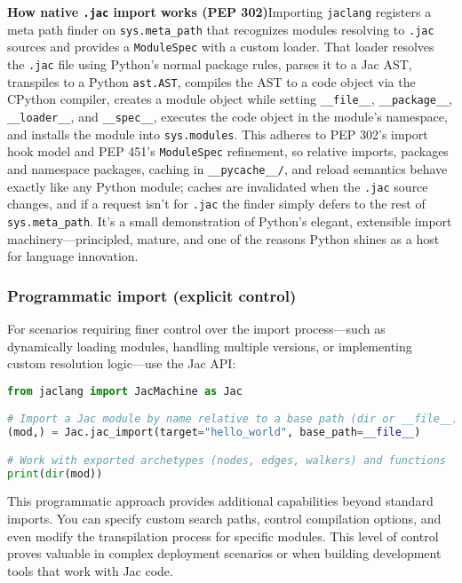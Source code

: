\begin{nerd}
\textbf{How native \texttt{.jac} import works (PEP 302)}\quad Importing \texttt{jaclang} registers a meta path finder on \texttt{sys.meta\_path} that recognizes modules resolving to \texttt{.jac} sources and provides a \texttt{ModuleSpec} with a custom loader. That loader resolves the \texttt{.jac} file using Python's normal package rules, parses it to a Jac AST, transpiles to a Python \texttt{ast.AST}, compiles the AST to a code object via the CPython compiler, creates a module object while setting \texttt{\_\_file\_\_}, \texttt{\_\_package\_\_}, \texttt{\_\_loader\_\_}, and \texttt{\_\_spec\_\_}, executes the code object in the module's namespace, and installs the module into \texttt{sys.modules}. This adheres to PEP 302's import hook model and PEP 451's \texttt{ModuleSpec} refinement, so relative imports, packages and namespace packages, caching in \texttt{\_\_pycache\_\_/}, and reload semantics behave exactly like any Python module; caches are invalidated when the \texttt{.jac} source changes, and if a request isn't for \texttt{.jac} the finder simply defers to the rest of \texttt{sys.meta\_path}. It's a small demonstration of Python's elegant, extensible import machinery—principled, mature, and one of the reasons Python shines as a host for language innovation.
\end{nerd}

\subsubsection{Programmatic import (explicit control)}

For scenarios requiring finer control over the import process—such as dynamically loading modules, handling multiple versions, or implementing custom resolution logic—use the Jac API:

\begin{lstlisting}[language=Python]
from jaclang import JacMachine as Jac

# Import a Jac module by name relative to a base path (dir or __file__)
(mod,) = Jac.jac_import(target="hello_world", base_path=__file__)

# Work with exported archetypes (nodes, edges, walkers) and functions
print(dir(mod))
\end{lstlisting}

This programmatic approach provides additional capabilities beyond standard imports. You can specify custom search paths, control compilation options, and even modify the transpilation process for specific modules. This level of control proves valuable in complex deployment scenarios or when building development tools that work with Jac code.

